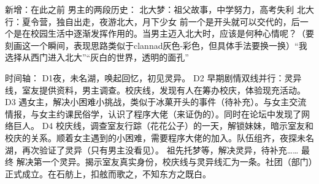 新增：在此之前
男主的两段历史：
北大梦：祖父故事，中学努力，高考失利
北大行：夏令营，独自出走，夜游北大，月下少女
前一个是开头就可以交代的，后一个是在校园生活中逐渐发挥作用的。当男主迈入北大时，应该是何种心情呢？（要刻画这一个瞬间，表现思路类似于clannad灰色-彩色，但具体手法要换一换）“我选择从西门进入北大”“灰白的世界，透明的面孔”


时间轴：
D1夜，未名湖，唤起回忆，初见灵异。
D2 早期剧情双线并行：灵异线，室友提供资料，男主调查。校庆线，发现有人在筹办校庆，体验现充活动。
D3 遇女主，解决小困难小挑战，类似于冰菓开头的事件（待补充）。与女主交流情报，与女主约课民俗学，认识了程序大佬（来证伪的）。同时在论坛中发现了网络巨人。
D4 校庆线，调查室友行踪（花花公子）的一天，解锁妹妹，暗示室友和校庆的关系。顺着女主遇到的小困难，需要程序大佬的加入。队伍组齐，夜探未名湖，再次验证了灵异（只有男主没看见）。
祖先托梦等，解决灵异，待补充……
最终 解决第一个灵异。揭示室友真实身份，校庆线与灵异线汇为一条。社团（部门）正式成立。在石舫上，扣舷而歌之，不知东方之既白。
